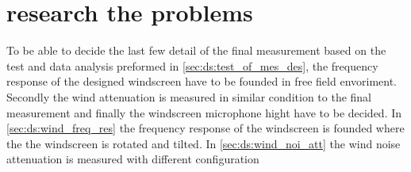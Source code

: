 
      
            
\section{research the problems}
To be able to decide the last few detail of the final measurement based on the test and data analysis preformed in \autoref{sec:ds:test_of_mes_des}, the frequency response of the designed windscreen have to be founded in free field envoriment. Secondly the wind attenuation is measured in similar condition to the final measurement and finally the windscreen microphone hight have to be decided. In \autoref{sec:ds:wind_freq_res} the frequency response of the windscreen is founded where the the windscreen is rotated and tilted. In \autoref{sec:ds:wind_noi_att} the wind noise attenuation is measured with different configuration 

